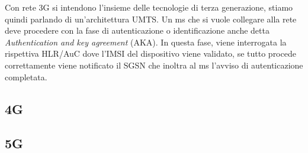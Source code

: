 Con rete 3G si intendono l'insieme delle tecnologie di terza generazione, stiamo quindi parlando di un'architettura UMTS.
Un \acrshort{ms} che si vuole collegare alla rete deve procedere con la fase di autenticazione o identificazione anche detta \textit{Authentication and key agreement}
(AKA). In questa fase, viene interrogata la rispettiva HLR/AuC dove l'IMSI del dispositivo viene validato, se tutto procede correttamente
viene notificato il SGSN che inoltra al \acrshort{ms} l'avviso di autenticazione completata.

\clearpage

\subsection{4G}
\clearpage

\subsection{5G}
